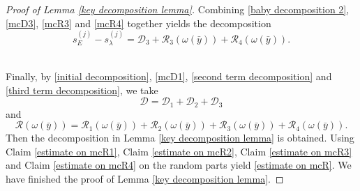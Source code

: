 \documentclass[10pt,a4paper]{amsart}
\newcommand{\mcD}{\mathcal{D}}
\newcommand{\mcR}{\mathcal{R}}
\newcommand{\smallSj}{s^{(j)}}
\begin{document}
\begin{proof}[Proof of Lemma \ref{key decomposition lemma}]
Combining \eqref{baby decomposition 2}, \eqref{mcD3}, \eqref{mcR3} and \eqref{mcR4} together  yields the decomposition
\begin{equation}\label{third term decomposition}
  \smallSj_E-\smallSj_{\lambda} = \mcD_3+\mcR_3(\omega(\bar{y}))+\mcR_4(\omega(\bar{y})).
\end{equation}





 \\

\noindent Finally, by \eqref{initial decomposition}, \eqref{mcD1}, \eqref{second term decomposition} and \eqref{third term decomposition}, we take 
\[\mcD=\mcD_1+\mcD_2+\mcD_3\]
and 
\[\mcR(\omega(\bar{y}))= \mcR_1(\omega(\bar{y}))+\mcR_2(\omega(\bar{y}))+\mcR_3(\omega(\bar{y}))+\mcR_4(\omega(\bar{y})).\]
Then the decomposition in Lemma \ref{key decomposition lemma} is obtained. Using Claim \ref{estimate on mcR1}, Claim \ref{estimate on mcR2}, Claim \ref{estimate on mcR3} and Claim \ref{estimate on mcR4} on the random parts  yield \eqref{estimate on mcR}. We have finished  the proof of Lemma \ref{key decomposition lemma}.
\end{proof}
\end{document}
